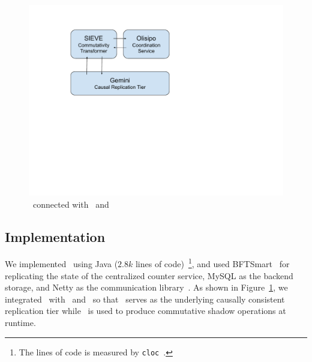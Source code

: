 \begin{figure}[t!]
\centering
\includegraphics[width=0.76\columnwidth]{./figures/por/tool_intergated.pdf}
\caption{\coordtool\ connected with \tool\ and \gemini}
\label{fig:toolwithenvironment}
\end{figure}

\subsection{Implementation}
We implemented \coordtool\ using Java ($2.8k$ lines of code)~\footnote{The lines of code is
measured by {\tt cloc}~\cite{codecounter}.}, and used BFTSmart~\cite{bftsmartcode} for replicating
the state of the centralized counter service, MySQL as the backend storage, and Netty
as the communication library~\cite{Netty}. As shown in Figure~\ref{fig:toolwithenvironment},
we integrated \coordtool\ with \gemini\ and \tool\ so
that \gemini\ serves as the underlying causally consistent replication tier while \tool\ is used to
produce commutative shadow operations at runtime. 

